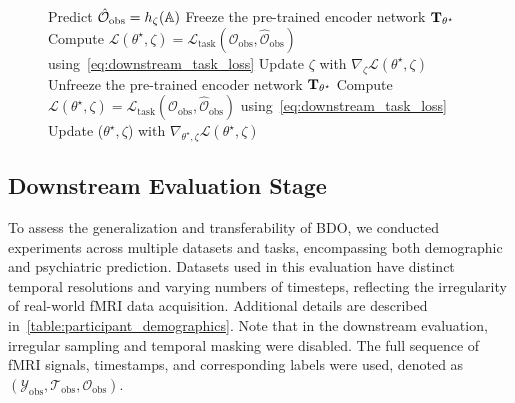 \begin{figure}[!t]
\begin{minipage}[t]{0.47\textwidth}
\begin{algorithm}[H]
\begin{algorithmic}[1]
        \STATE Predict $\hat{\mathcal{O}}_{\text{obs}} = h_{\zeta}(\mathbb{A})$        
            \STATE Freeze the pre-trained encoder network $\mathbf{T}_{\theta^{\star}}$
            \STATE Compute $\mathcal{L}(\theta^{\star}, \zeta) = \mathcal{L}_{\text{task}}(\mathcal{O}_{\text{obs}}, \hat{\mathcal{O}}_{\text{obs}})$ using~\eqref{eq:downstream_task_loss}
            \STATE Update $\zeta$ with $\nabla_{\zeta} \mathcal{L}(\theta^{\star}, \zeta)$
            \STATE Unfreeze the pre-trained encoder network $\mathbf{T}_{\theta^{\star}}$
            \STATE Compute $\mathcal{L}(\theta^{\star}, \zeta) = \mathcal{L}_{\text{task}}(\mathcal{O}_{\text{obs}}, \hat{\mathcal{O}}_{\text{obs}})$ using~\eqref{eq:downstream_task_loss}
            \STATE Update ($\theta^{\star}, \zeta$) with $\nabla_{\theta^{\star}, \zeta} \mathcal{L}(\theta^{\star}, \zeta)$
        \ENDIF
\end{algorithmic}\label{algorithm:downstream}
\end{algorithm}
\vspace{-8mm}
\end{minipage}
\end{figure}

\subsection{Downstream Evaluation Stage}
To assess the generalization and transferability of BDO, we conducted experiments across multiple datasets and tasks, encompassing both demographic and psychiatric prediction. Datasets used in this evaluation have distinct temporal resolutions and varying numbers of timesteps, reflecting the irregularity of real-world fMRI data acquisition. Additional details are described in~\cref{table:participant_demographics}. Note that in the downstream evaluation, irregular sampling and temporal masking were disabled. The full sequence of fMRI signals, timestamps, and corresponding labels were used, denoted as $(\mathcal{Y}_{\text{obs}}, \mathcal{T}_{\text{obs}}, \mathcal{O}_{\text{obs}})$.



